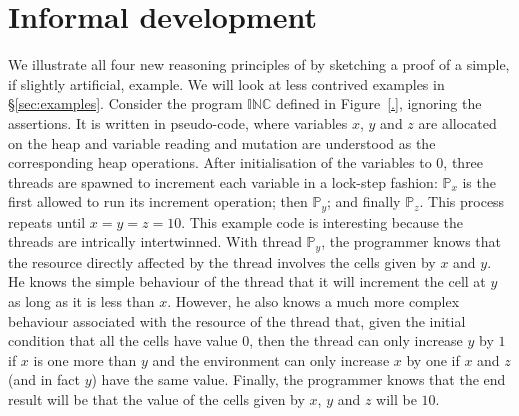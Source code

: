 \section{Informal development}
\label{sec:intuition}

We illustrate all four new reasoning principles of \colosl by
sketching a proof of a simple, if slightly artificial, example.  We will look
at less contrived examples in \S\ref{sec:examples}. Consider the
program $\mathbb{INC}$ defined in Figure~\ref{.}, ignoring the
assertions. It is written in pseudo-code, where variables $x$, $y$ and
$z$ are allocated on the heap and variable reading and mutation are
understood as the corresponding heap operations. After initialisation
of the variables to $0$, three threads are spawned to increment each
variable in a lock-step fashion: $\mathbb{P}_x$ is the first allowed
to run its increment operation; then $\mathbb{P}_y$; and finally
$\mathbb{P}_z$. This process repeats until $x = y = z = 10$.  This
example code is interesting because the threads are intrically
intertwinned. With thread $\mathbb{P}_y$, the programmer
knows that the resource directly affected by the thread involves the cells
given by $x$ and $y$. He knows the 
simple  behaviour of the thread that 
 it will increment the cell at $y$ as long as it is less than $x$.
However, he also knows a
much more complex  behaviour associated with the resource of  the thread that,  given the initial
 condition that all the cells have value $0$, then the thread can only
 increase  $y$ by $1$ if 
$x$ is  one more than $y$  and the environment can only  increase
$x$ by one if 
$x$ and $z$ (and in fact  $y$) have the same value. Finally, the
programmer knows that the end result will be that the value of the
cells given by $x$, $y$ and $z$ will be $10$. 





